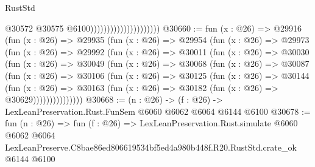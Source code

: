 \begin{lexlean}{RustStd}
\begin{coremodule}
                                              @30572
                                              @30575
                                              @6100)))))))))))))))))))))
@30660 := fun (x : @26) =>
  @29916
    (fun (x : @26) =>
    @29935
      (fun (x : @26) =>
      @29954
        (fun (x : @26) =>
        @29973
          (fun (x : @26) =>
          @29992
            (fun (x : @26) =>
            @30011
              (fun (x : @26) =>
              @30030
                (fun (x : @26) =>
                @30049
                  (fun (x : @26) =>
                  @30068
                    (fun (x : @26) =>
                    @30087
                      (fun (x : @26) =>
                      @30106
                        (fun (x : @26) =>
                        @30125
                          (fun (x : @26) =>
                          @30144
                            (fun (x : @26) =>
                            @30163 (fun (x : @26) => @30182 (fun (x : @26) => @30629)))))))))))))))
@30668 := (n : @26) -> (f : @26) -> LexLeanPreservation.Rust.FunSem @6060 @6062 @6064 @6144 @6100
@30678 := fun (n : @26) =>
  fun (f : @26) =>
  LexLeanPreservation.Rust.simulate
    @6060
    @6062
    @6064
    LexLeanPreserve.C8bae86ed806619534bf5ed4a980b448f.R20.RustStd.crate_ok
    @6144
    @6100
\end{coremodule}
\end{lexlean}

